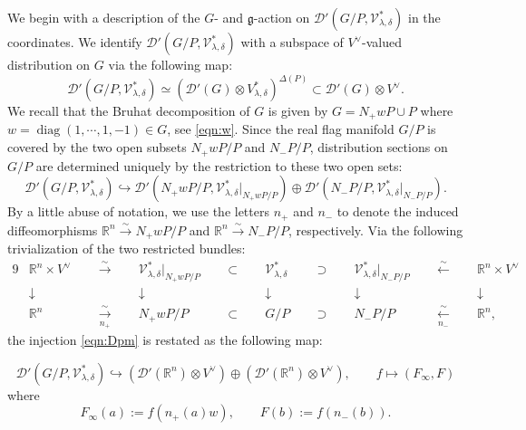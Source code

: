 We begin with a description of 
 the $G$- and ${\mathfrak{g}}$-action 
 on ${\mathcal{D}}'
    (G/P, {\mathcal{V}}_{\lambda, \delta}^{\ast})$
 in the coordinates.  
We identify ${\mathcal{D}}'(G/P, {\mathcal{V}}_{\lambda, \delta}^{\ast})$
 with a subspace of $V^{\vee}$-valued distribution on $G$
 via the following map: 
\[
   {\mathcal{D}}'(G/P, {\mathcal{V}}_{\lambda, \delta}^{\ast})
   \simeq 
  ({\mathcal{D}}'(G) \otimes V_{\lambda, \delta}^{\ast})^{\Delta(P)}
   \subset 
   {\mathcal{D}}'(G) \otimes V^{\vee}.  
\]
We recall
 that the Bruhat decomposition of $G$ is given by 
 $G=N_+ w P \cup P$ 
 where 
$w= \operatorname{diag}(1,\cdots,1,-1) \in G$, 
 see \eqref{eqn:w}.  
Since the real flag manifold $G/P$ is covered by the two open subsets
 $N_+ w P/P$ and $N_- P/P$, 
 distribution sections on $G/P$ are determined uniquely
 by the restriction  
 to these two open sets:
\begin{equation}
\label{eqn:Dpm}
{\mathcal{D}}'(G/P, {\mathcal{V}}_{\lambda, \delta}^{\ast})
\hookrightarrow
{\mathcal{D}}'(N_+ w P/P, {\mathcal{V}}_{\lambda, \delta}^{\ast}|_{N_+ w P/P})
\oplus
{\mathcal{D}}'(N_- P/P,  {\mathcal{V}}_{\lambda, \delta}^{\ast}|_{N_- P/P}).  
\end{equation}
By a little abuse of notation,
 we use the letters $n_+$ and $n_-$
 to denote the induced diffeomorphisms
$
   {\mathbb{R}}^n \overset \sim \to 
   N_+ w P/P
$
 and 
$
   {\mathbb{R}}^n \overset \sim \to 
   N_- P/P
$, 
respectively.  
Via the following trivialization of the two restricted bundles:
\begin{alignat*}{9}
&  {\mathbb{R}}^n  \times V^{\vee}
\;\;
&& \overset \sim \to 
\;\;
&& {\mathcal{V}}_{\lambda,\delta}^{\ast}|_{N_+ w P/P}
\;\;
&& \subset 
\;\;
&& {\mathcal{V}}_{\lambda,\delta}^{\ast}
\;\;
&& \supset
\;\;
&& {\mathcal{V}}_{\lambda,\delta}^{\ast}|_{N_- P/P}
\;\;
&& \overset \sim \leftarrow
\;\;
&& {\mathbb{R}}^n \times V^{\vee}
\\
& \downarrow
&&
&& \downarrow
&& 
&& \downarrow
&&
&& \downarrow
&&
&&\downarrow
\\
&  {\mathbb{R}}^n  
\;\;
&& \underset{n_+} {\overset \sim \to} 
\;\;
&& N_+ w P / P
\;\;
&& \subset 
\;\;
&& G/P
\;\;
&& \supset
\;\;
&& N_- P / P
\;\;
&& \underset {n_-}{\overset \sim \leftarrow}
\;\;
&& {\mathbb{R}}^n, 
\end{alignat*}
the injection \eqref{eqn:Dpm} is restated as the following map:

\begin{equation}
\label{eqn:fFpm}
   {\mathcal{D}}'(G/P, {\mathcal{V}}_{\lambda, \delta}^{\ast})
   \hookrightarrow
   \left({\mathcal{D}}'({\mathbb{R}}^n) \otimes V^{\vee}\right)
   \oplus
   \left({\mathcal{D}}'({\mathbb{R}}^n) \otimes V^{\vee}\right), 
\qquad
   f \mapsto (F_{\infty}, F)
\end{equation}
where 
\begin{equation*}
F_{\infty}(a):= f(n_+(a) w), 
\qquad
F(b):= f(n_-(b)).  
\end{equation*}



